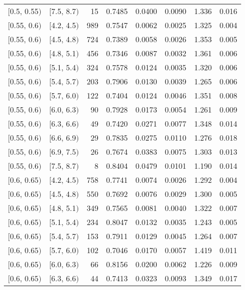 \begin{longtable}{| l | l | r | r | r | r | r | r |}
        $[$0.5, 0.55$)$ & $[$7.5, 8.7$)$ & 15 & 0.7485 & 0.0400 & 0.0090 & 1.336 & 0.016 \\
        $[$0.55, 0.6$)$ & $[$4.2, 4.5$)$ & 989 & 0.7547 & 0.0062 & 0.0025 & 1.325 & 0.004 \\
        $[$0.55, 0.6$)$ & $[$4.5, 4.8$)$ & 724 & 0.7389 & 0.0058 & 0.0026 & 1.353 & 0.005 \\
        $[$0.55, 0.6$)$ & $[$4.8, 5.1$)$ & 456 & 0.7346 & 0.0087 & 0.0032 & 1.361 & 0.006 \\
        $[$0.55, 0.6$)$ & $[$5.1, 5.4$)$ & 324 & 0.7578 & 0.0124 & 0.0035 & 1.320 & 0.006 \\
        $[$0.55, 0.6$)$ & $[$5.4, 5.7$)$ & 203 & 0.7906 & 0.0130 & 0.0039 & 1.265 & 0.006 \\
        $[$0.55, 0.6$)$ & $[$5.7, 6.0$)$ & 122 & 0.7404 & 0.0124 & 0.0046 & 1.351 & 0.008 \\
        $[$0.55, 0.6$)$ & $[$6.0, 6.3$)$ & 90 & 0.7928 & 0.0173 & 0.0054 & 1.261 & 0.009 \\
        $[$0.55, 0.6$)$ & $[$6.3, 6.6$)$ & 49 & 0.7420 & 0.0271 & 0.0077 & 1.348 & 0.014 \\
        $[$0.55, 0.6$)$ & $[$6.6, 6.9$)$ & 29 & 0.7835 & 0.0275 & 0.0110 & 1.276 & 0.018 \\
        $[$0.55, 0.6$)$ & $[$6.9, 7.5$)$ & 26 & 0.7674 & 0.0383 & 0.0075 & 1.303 & 0.013 \\
        $[$0.55, 0.6$)$ & $[$7.5, 8.7$)$ & 8 & 0.8404 & 0.0479 & 0.0101 & 1.190 & 0.014 \\
        $[$0.6, 0.65$)$ & $[$4.2, 4.5$)$ & 758 & 0.7741 & 0.0074 & 0.0026 & 1.292 & 0.004 \\
        $[$0.6, 0.65$)$ & $[$4.5, 4.8$)$ & 550 & 0.7692 & 0.0076 & 0.0029 & 1.300 & 0.005 \\
        $[$0.6, 0.65$)$ & $[$4.8, 5.1$)$ & 349 & 0.7565 & 0.0081 & 0.0040 & 1.322 & 0.007 \\
        $[$0.6, 0.65$)$ & $[$5.1, 5.4$)$ & 234 & 0.8047 & 0.0132 & 0.0035 & 1.243 & 0.005 \\
        $[$0.6, 0.65$)$ & $[$5.4, 5.7$)$ & 153 & 0.7911 & 0.0129 & 0.0045 & 1.264 & 0.007 \\
        $[$0.6, 0.65$)$ & $[$5.7, 6.0$)$ & 102 & 0.7046 & 0.0170 & 0.0057 & 1.419 & 0.011 \\
        $[$0.6, 0.65$)$ & $[$6.0, 6.3$)$ & 66 & 0.8156 & 0.0200 & 0.0062 & 1.226 & 0.009 \\
        $[$0.6, 0.65$)$ & $[$6.3, 6.6$)$ & 44 & 0.7413 & 0.0323 & 0.0093 & 1.349 & 0.017 \\

\end{longtable}
